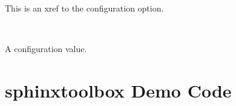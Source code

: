 \documentclass[letterpaper,10pt,english]{sphinxmanual}
\begin{document}
This is an xref to the {\hyperref[\detokenize{confval:confval-github_repository}]{}} configuration option.


\vspace{5px}

\begin{fulllineitems}
\label{\detokenize{confval:confval-something}}~
\vspace{-25px}

A configuration value.

\end{fulllineitems}



\chapter{sphinx\sphinxhyphen{}toolbox Demo \sphinxhyphen{} Code}
\label{\detokenize{code-block:sphinx-toolbox-demo-code}}\label{\detokenize{code-block::doc}}
\begin{sphinxVerbatim}[commandchars=\\\{\}]
 
\end{sphinxVerbatim}

\begin{sphinxVerbatim}[commandchars=\\\{\}]
 
\end{sphinxVerbatim}

\begin{sphinxVerbatim}[commandchars=\\\{\}]
 
\end{sphinxVerbatim}

\begin{sphinxVerbatim}[commandchars=\\\{\}]
 
\end{sphinxVerbatim}
\end{document}
